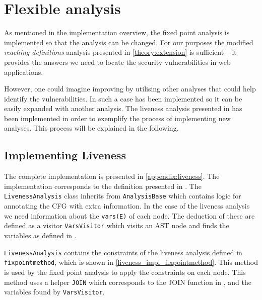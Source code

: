 \section{Flexible analysis}\label{impl:flexible}
As mentioned in the implementation overview, the fixed point analysis is implemented so that the analysis can be changed.
For our purposes the modified \emph{reaching definitions} analysis presented in \cref{theory:extension} is sufficient -- it provides the answers we need to locate the security vulnerabilities in web applications.

However, one could imagine improving \pyt{} by utilising other analyses that could help identify the vulnerabilities.
In such a case \pyt{} has been implemented so it can be easily expanded with another analysis.
The liveness analysis presented in \citet[p.~19]{schwartzbach} has been implemented in order to exemplify the process of implementing new analyses.
This process will be explained in the following.

\subsection{Implementing Liveness}
The complete implementation is presented in \cref{appendix:liveness}.
The implementation corresponds to the definition presented in \citet[p.~20]{schwartzbach}.
The \texttt{Liveness\-Analysis} class inherits from \texttt{AnalysisBase} which contains logic for annotating the CFG with extra information.
In the case of the liveness analysis we need information about the \texttt{vars(E)} of each node.
The deduction of these are defined as a visitor \texttt{VarsVisitor} which visits an AST node and finds the variables as defined in \citet{schwartzbach}.

\texttt{LivenessAnalysis} contains the constraints of the liveness analysis defined in \texttt{fixpointmethod}, which is shown in \cref{liveness_impl_fixpointmethod}.
This method is used by the fixed point analysis to apply the constraints on each node.
This method uses a helper \texttt{JOIN} which corresponds to the JOIN function in \citet{schwartzbach}, and the variables found by \texttt{VarsVisitor}.

